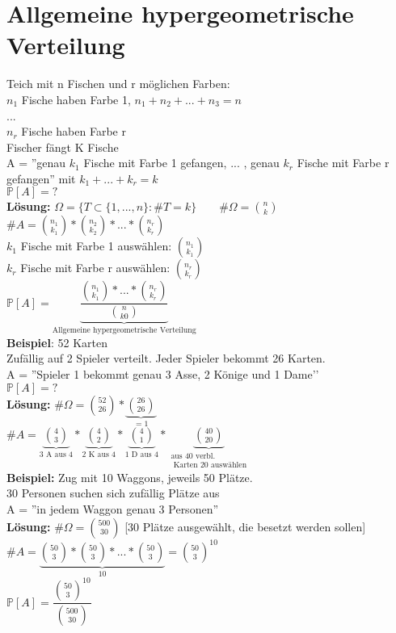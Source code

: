 \section{Allgemeine hypergeometrische Verteilung}
Teich mit n Fischen und r möglichen Farben:\medskip\\
$n_1$ Fische haben Farbe 1, \hspace{1cm} $n_1 + n_2 +...+n_3 = n$\\
...\\
$n_r$ Fische haben Farbe r\medskip\\
Fischer fängt K Fische\\
A = ''genau $k_1$ Fische mit Farbe 1 gefangen, ... , genau $k_r$ Fische mit Farbe r gefangen'' mit $k_1 + ... + k_r = k$\medskip\\
$\mathds{P}[A] = ?$\medskip\\
\textbf{Lösung:} $\Omega = \{ T \subset \{1,...,n\}:\#T=k\} \qquad \#\Omega = \binom{n}{k}$\medskip\\
$\#A = \binom{n_1}{k_1} * \binom{n_2}{k_2}*...*\binom{n_r}{k_r}$\medskip\\
$k_1$ Fische mit Farbe 1 auswählen: $\binom{n_1}{k_1}$\\
$k_r$ Fische mit Farbe r auswählen: $\binom{n_r}{k_r}$\medskip\\
$\mathds{P}[A] = \underbrace{\dfrac{\binom{n_1}{k_1}*...*\binom{n_r}{k_r}}{\binom{n}{k0}}}_\text{Allgemeine hypergeometrische Verteilung}$\medskip\\
\textbf{Beispiel}: 52 Karten\\
Zufällig auf 2 Spieler verteilt. Jeder Spieler bekommt 26 Karten.\medskip\\
A = ''Spieler 1 bekommt genau 3 Asse, 2 Könige und 1 Dame'\smallskip'\\
$\mathds{P}[A] = ?$\medskip\\
\textbf{Lösung:} $\#\Omega = \binom{52}{26} * \underbrace{\binom{26}{26}}_{=1}$\medskip\\
$\#A=\underbrace{\binom{4}{3}}_\text{3 A aus 4}*\underbrace{\binom{4}{2}}_\text{2 K aus 4}*\underbrace{\binom{4}{1}}_\text{1 D aus 4}*\underbrace{\binom{40}{20}}_{\substack{\text{aus 40 verbl.}\\\text{ Karten 20 auswählen}}}$\medskip\\
\textbf{Beispiel:} Zug mit 10 Waggons, jeweils 50 Plätze.\\
30 Personen suchen sich zufällig Plätze aus\smallskip\\
A = ''in jedem Waggon genau 3 Personen''\medskip\\
\textbf{Lösung:} $\#\Omega = \binom{500}{30}$ [30 Plätze ausgewählt, die besetzt werden sollen]\medskip\\
$\#A = \underbrace{\binom{50}{3}*\binom{50}{3}*...*\binom{50}{3}}_10 = \binom{50}{3}^{10}$\smallskip\\
$\mathds{P}[A] = \dfrac{\binom{50}{3}^{10}}{\binom{500}{30}}$
